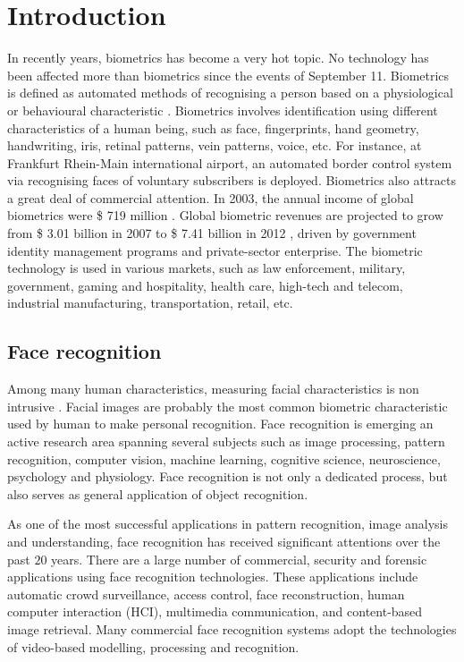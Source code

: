 \chapter{Introduction}
\label{ch:intro}
In recently years, biometrics has become a very hot topic. No technology has been affected more than biometrics since the events of September 11. Biometrics is defined as automated methods of recognising a person based on a physiological or behavioural characteristic \cite{biomcons}. Biometrics involves identification using different characteristics of a human being, such as face, fingerprints, hand geometry, handwriting, iris, retinal patterns, vein patterns, voice, etc. For instance, at Frankfurt Rhein-Main international airport, an automated border control system via recognising faces of voluntary subscribers is deployed.
Biometrics also attracts a great deal of commercial attention. In 2003, the annual income of global biometrics were \$ 719 million \cite{Lu2006}. Global biometric revenues are projected to grow from \$ 3.01 billion in 2007 to \$ 7.41 billion in 2012 \cite{intlbiogroup}, driven by government identity management programs and private-sector enterprise. The biometric technology is used in various markets, such as law enforcement, military, government, gaming and hospitality, health care, high-tech and telecom, industrial manufacturing, transportation, retail, etc.

\section{Face recognition}
Among many human characteristics, measuring facial characteristics is non intrusive \cite{Jain2004}. Facial images are probably the most common biometric characteristic used by human to make personal recognition. Face recognition is emerging an active research area spanning several subjects such as image processing, pattern recognition, computer vision, machine learning, cognitive science, neuroscience, psychology and physiology. Face recognition is not only a dedicated process, but also serves as general application of object recognition. 

As one of the most successful applications in pattern recognition, image analysis and understanding, face recognition has received significant attentions over the past $20$ years. There are a large number of commercial, security and forensic applications using face recognition technologies. These applications include automatic crowd surveillance, access control, face reconstruction, human computer interaction (HCI), multimedia communication, and content-based image retrieval. Many commercial face recognition systems \cite{Fell2002, Bell2001, Pope2001, Gorsuch22001} adopt the technologies of video-based modelling, processing and recognition.


